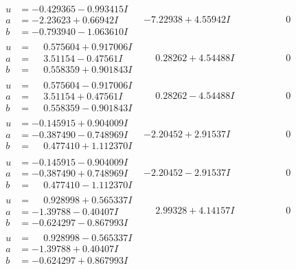\documentclass[1p]{elsarticle_modified}
\theoremstyle{definition}
\begin{document}
$$\begin{array}{c|c|c}
\begin{aligned}
u &= -0.429365 - 0.993415 I \\
a &= -2.23623 + 0.66942 I \\
b &= -0.793940 - 1.063610 I\end{aligned}
 & -7.22938 + 4.55942 I & \phantom{-0.000000 } 0 \\ \hline\begin{aligned}
u &= \phantom{-}0.575604 + 0.917006 I \\
a &= \phantom{-}3.51154 - 0.47561 I \\
b &= \phantom{-}0.558359 + 0.901843 I\end{aligned}
 & \phantom{-}0.28262 + 4.54488 I & \phantom{-0.000000 } 0 \\ \hline\begin{aligned}
u &= \phantom{-}0.575604 - 0.917006 I \\
a &= \phantom{-}3.51154 + 0.47561 I \\
b &= \phantom{-}0.558359 - 0.901843 I\end{aligned}
 & \phantom{-}0.28262 - 4.54488 I & \phantom{-0.000000 } 0 \\ \hline\begin{aligned}
u &= -0.145915 + 0.904009 I \\
a &= -0.387490 - 0.748969 I \\
b &= \phantom{-}0.477410 + 1.112370 I\end{aligned}
 & -2.20452 + 2.91537 I & \phantom{-0.000000 } 0 \\ \hline\begin{aligned}
u &= -0.145915 - 0.904009 I \\
a &= -0.387490 + 0.748969 I \\
b &= \phantom{-}0.477410 - 1.112370 I\end{aligned}
 & -2.20452 - 2.91537 I & \phantom{-0.000000 } 0 \\ \hline\begin{aligned}
u &= \phantom{-}0.928998 + 0.565337 I \\
a &= -1.39788 - 0.40407 I \\
b &= -0.624297 - 0.867993 I\end{aligned}
 & \phantom{-}2.99328 + 4.14157 I & \phantom{-0.000000 } 0 \\ \hline\begin{aligned}
u &= \phantom{-}0.928998 - 0.565337 I \\
a &= -1.39788 + 0.40407 I \\
b &= -0.624297 + 0.867993 I\end{aligned}

\end{array}$$
\end{document}
